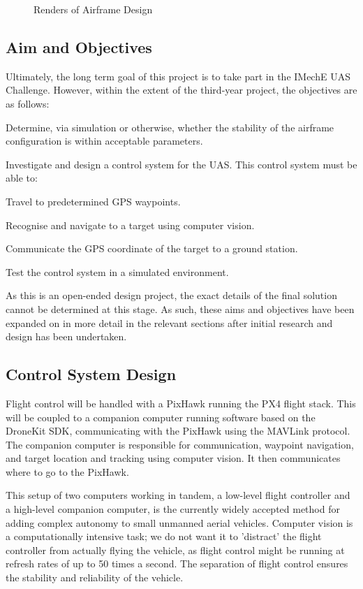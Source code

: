 \documentclass[11pt]{article}
\begin{document}
\begin{figure}[h]
    \caption{Renders of Airframe Design}
    \label{fig:saucy_render}
\end{figure}


\subsection{Aim and Objectives}
Ultimately, the long term goal of this project is to take part in the IMechE UAS Challenge. However, within the extent of the third-year project, the objectives are as follows:

\begin{compactenum}
    \item Determine, via simulation or otherwise, whether the stability of the airframe configuration is within acceptable parameters.
    \item Investigate and design a control system for the UAS. This control system must be able to:
    \begin{compactenum}
        \item Travel to predetermined GPS waypoints.
        \item Recognise and navigate to a target using computer vision.
        \item Communicate the GPS coordinate of the target to a ground station.
    \end{compactenum}
    \item Test the control system in a simulated environment.
\end{compactenum}

As this is an open-ended design project, the exact details of the final solution cannot be determined at this stage.
As such, these aims and objectives have been expanded on in more detail in the relevant sections after initial research and design has been undertaken.

\subsection{Control System Design}
Flight control will be handled with a PixHawk running the PX4 flight stack. This will be coupled to a companion computer running software based on the DroneKit SDK, communicating with the PixHawk using the MAVLink protocol. The companion computer is responsible for communication, waypoint navigation, and target location and tracking using computer vision. It then communicates where to go to the PixHawk.

This setup of two computers working in tandem, a low-level flight controller and a high-level companion computer, is the currently widely accepted method for adding complex autonomy to small unmanned aerial vehicles. Computer vision is a computationally intensive task; we do not want it to 'distract' the flight controller from actually flying the vehicle, as flight control might be running at refresh rates of up to 50 times a second. The separation of flight control ensures the stability and reliability of the vehicle.
\end{document}
